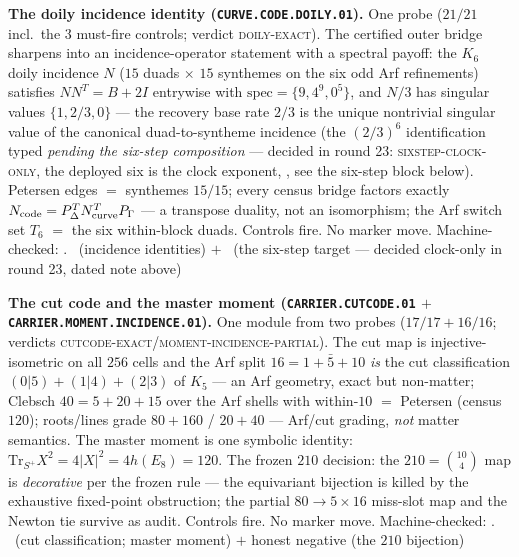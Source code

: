 \par\smallskip\noindent\textbf{The doily incidence identity
(\texttt{CURVE.CODE.DOILY.01}).}
One probe ($21/21$ incl.\ the $3$ must-fire controls; verdict
\textsc{doily-exact}).  The certified outer bridge sharpens into an
incidence-operator statement with a spectral payoff: the $K_6$
doily incidence $N$ ($15$ duads $\times$ $15$ synthemes on the six
odd Arf refinements) satisfies $NN^{T}=B+2I$ entrywise with
$\mathrm{spec}=\{9,4^9,0^5\}$, and $N/3$ has singular values
$\{1,2/3,0\}$ --- the recovery base rate $2/3$ is the unique
nontrivial singular value of the canonical duad-to-syntheme
incidence (the $(2/3)^6$ identification typed \emph{pending the
six-step composition} --- decided in round 23:
\textsc{sixstep-clock-only}, the deployed six is the clock
exponent, , see the
six-step block below).  Petersen edges $=$ synthemes $15/15$;
every census bridge factors exactly
$N_{\rm code}=P_\Delta^{T}N_{\rm curve}^{T}P_\Gamma$ --- a
transpose duality, not an isomorphism; the Arf switch set $T_6$
$=$ the six within-block duads.  Controls fire.  No marker move.
Machine-checked: .
\mE\ (incidence identities) $+$ \mO\ (the six-step target ---
decided clock-only in round 23, dated note above)
\par\smallskip

\par\smallskip\noindent\textbf{The cut code and the master moment
(\texttt{CARRIER.CUTCODE.01} $+$
\texttt{CARRIER.MOMENT.INCIDENCE.01}).}
One module from two probes ($17/17+16/16$; verdicts
\textsc{cutcode-exact}/\textsc{moment-incidence-partial}).  The cut
map is injective-isometric on all $256$ cells and the Arf split
$16=1+\bar5+10$ \emph{is} the cut classification $(0|5)+(1|4)+(2|3)$
of $K_5$ --- an Arf geometry, exact but non-matter; Clebsch
$40=5+20+15$ over the Arf shells with within-$10$ $=$ Petersen
(census $120$); roots/lines grade $80+160$ / $20+40$ --- Arf/cut
grading, \emph{not} matter semantics.  The master moment is one
symbolic identity: $\mathrm{Tr}_{S^{+}}X^2=4|X|^2=4h(E_8)=120$.
The frozen $210$ decision: the $210=\binom{10}{4}$ map is
\emph{decorative} per the frozen rule --- the equivariant bijection
is killed by the exhaustive fixed-point obstruction; the partial
$80\to5\times16$ miss-slot map and the Newton tie survive as
audit.  Controls fire.  No marker move.
Machine-checked: .
\mE\ (cut classification; master moment) $+$ honest negative
(the $210$ bijection)
\par\smallskip

